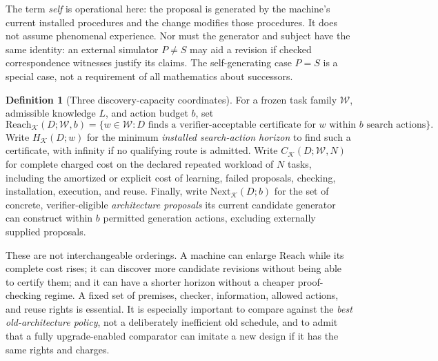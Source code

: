 \documentclass[11pt,letterpaper]{article}
\theoremstyle{definition}
\newtheorem{definition}[theorem]{Definition}
\theoremstyle{remark}
\newcommand{\K}{\mathcal K}
\begin{document}
The term \emph{self} is operational here: the proposal is generated by the machine's current installed procedures and the change modifies those procedures. It does not assume phenomenal experience. Nor must the generator and subject have the same identity: an external simulator $P\ne S$ may aid a revision if checked correspondence witnesses justify its claims. The self-generating case $P=S$ is a special case, not a requirement of all mathematics about successors.

\begin{definition}[Three discovery-capacity coordinates]\label{def:coords}
For a frozen task family $\mathcal W$, admissible knowledge $L$, and action budget $b$, set
\[
 \mathrm{Reach}_{\K}(D;\mathcal W,b)=\{w\in\mathcal W:\text{$D$ finds a verifier-acceptable certificate for $w$ within $b$ search actions}\}.
\]
Write $H_{\K}(D;w)$ for the minimum \emph{installed search-action horizon} to find such a certificate, with infinity if no qualifying route is admitted. Write $C_{\K}(D;\mathcal W,N)$ for complete charged cost on the declared repeated workload of $N$ tasks, including the amortized or explicit cost of learning, failed proposals, checking, installation, execution, and reuse. Finally, write $\mathrm{Next}_{\K}(D;b)$ for the set of concrete, verifier-eligible \emph{architecture proposals} its current candidate generator can construct within $b$ permitted generation actions, excluding externally supplied proposals.
\end{definition}

These are not interchangeable orderings. A machine can enlarge $\mathrm{Reach}$ while its complete cost rises; it can discover more candidate revisions without being able to certify them; and it can have a shorter horizon without a cheaper proof-checking regime. A fixed set of premises, checker, information, allowed actions, and reuse rights is essential. It is especially important to compare against the \emph{best old-architecture policy}, not a deliberately inefficient old schedule, and to admit that a fully upgrade-enabled comparator can imitate a new design if it has the same rights and charges.
\end{document}
